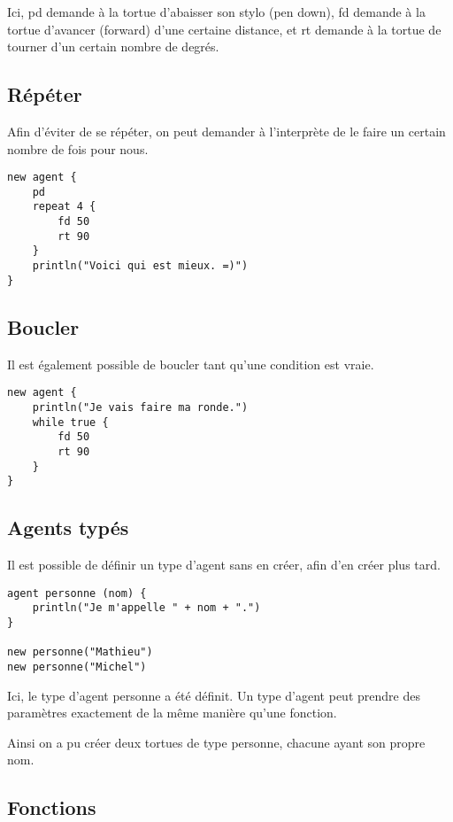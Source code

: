 Ici, pd demande à la tortue d'abaisser son stylo (pen down), fd demande à la tortue d'avancer (forward) d'une certaine distance, et rt demande à la tortue de tourner d'un certain nombre de degrés.

\subsection{Répéter}

Afin d'éviter de se répéter, on peut demander à l'interprète de le faire un certain nombre de fois pour nous.

\begin{verbatim}
new agent {
    pd
    repeat 4 {
        fd 50
        rt 90
    }
    println("Voici qui est mieux. =)")
}
\end{verbatim}

\subsection{Boucler}

Il est également possible de boucler tant qu'une condition est vraie.

\begin{verbatim}
new agent {
    println("Je vais faire ma ronde.")
    while true {
        fd 50
        rt 90
    }
}
\end{verbatim}

\subsection{Agents typés}

Il est possible de définir un type d'agent sans en créer, afin d'en créer plus tard.

\begin{verbatim}
agent personne (nom) {
    println("Je m'appelle " + nom + ".")
}

new personne("Mathieu")
new personne("Michel")
\end{verbatim}

Ici, le type d'agent personne a été définit. Un type d'agent peut prendre des paramètres exactement de la même manière qu'une fonction.

Ainsi on a pu créer deux tortues de type personne, chacune ayant son propre nom.

\subsection{Fonctions}

